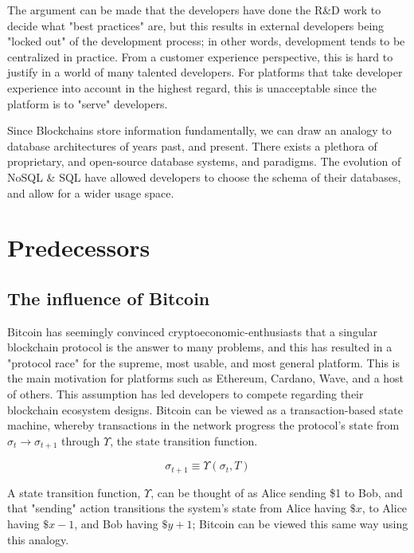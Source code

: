 \documentclass[12pt, titlepage, twocolumn]{report}
\begin{document}
The argument can be made that the developers have done the R\&D work to decide what "best practices" are, but this results in external developers being "locked out" of the development process; in other words, development tends to be centralized in practice. From a customer experience perspective, this is hard to justify in a world of many talented developers. For platforms that take developer experience into account in the highest regard, this is unacceptable since the platform is to "serve" developers.

Since Blockchains store information fundamentally, we can draw an analogy to database architectures of years past, and present. There exists a plethora of proprietary, and open-source database systems, and paradigms. The evolution of NoSQL \& SQL have allowed developers to choose the schema of their databases, and allow for a wider usage space.

\chapter{Predecessors}

\section{The influence of Bitcoin}
Bitcoin has seemingly convinced cryptoeconomic-enthusiasts that a singular blockchain protocol is the answer to many problems, and this has resulted in a "protocol race" for the supreme, most usable, and most general platform. This is the main motivation for platforms such as Ethereum, Cardano, Wave, and a host of others. This assumption has led developers to compete regarding their blockchain ecosystem designs. Bitcoin can be viewed as a transaction-based state machine, whereby transactions in the network progress the protocol's state from \(\sigma_t \rightarrow \sigma_{t+1}\) through \(\Upsilon\), the state transition function.

\begin{equation}
\sigma_{t+1} \equiv \Upsilon (\sigma_t,T)
\end{equation}

A state transition function, \(\Upsilon\), can be thought of as Alice sending \$1 to Bob, and that "sending" action transitions the system's state from Alice having \(\$x\), to Alice having \(\$x-1\), and Bob having \(\$y + 1\); Bitcoin can be viewed this same way using this analogy. 
\end{document}
